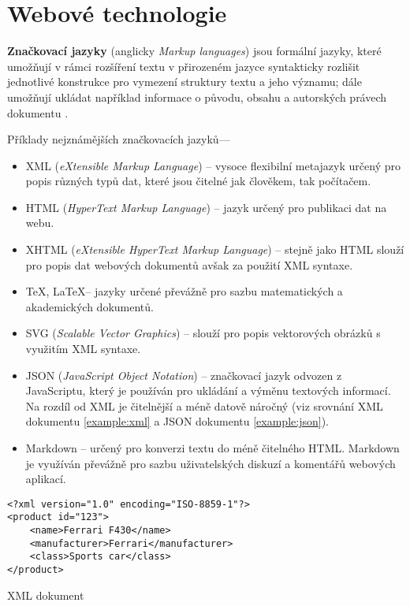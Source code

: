\chapter{Webové technologie}
\label{chap:languages}

\textbf{Značkovací jazyky} (anglicky \textit{Markup languages}) jsou formální jazyky, které umožňují v rámci rozšíření textu v přirozeném jazyce syntakticky rozlišit jednotlivé konstrukce pro vymezení struktury textu a jeho významu; dále umožňují ukládat například informace o původu, obsahu a autorských právech dokumentu \cite{modern-markup}.

Příklady nejznámějších značkovacích jazyků---

\begin{itemize}
    \item XML (\textit{eXtensible Markup Language}) -- vysoce flexibilní metajazyk určený pro popis různých typů dat, které jsou čitelné jak člověkem, tak počítačem.
    \item HTML (\textit{HyperText Markup Language}) -- jazyk určený pro publikaci dat na webu.
    \item XHTML (\textit{eXtensible HyperText Markup Language}) -- stejně jako HTML slouží pro popis dat webových dokumentů avšak za použití XML syntaxe.
    \item \TeX, \LaTeX -- jazyky určené převážně pro sazbu matematických a akademických dokumentů.
    \item SVG (\textit{Scalable Vector Graphics}) -- slouží pro popis vektorových obrázků s využitím XML syntaxe.
    \item JSON (\textit{JavaScript Object Notation}) -- značkovací jazyk odvozen z JavaScriptu, který je používán pro ukládání a výměnu textových informací. Na rozdíl od XML je čitelnější a méně datově náročný (viz srovnání XML dokumentu \ref{example:xml} a JSON dokumentu \ref{example:json}).
    \item Markdown -- určený pro konverzi textu do méně čitelného HTML. Markdown je využíván převážně pro sazbu uživatelských diskuzí a komentářů webových aplikací.
\end{itemize}

\begin{example}
    \centering
    \begin{lstlisting}
<?xml version="1.0" encoding="ISO-8859-1"?>
<product id="123">
    <name>Ferrari F430</name>
    <manufacturer>Ferrari</manufacturer>
    <class>Sports car</class>
</product>
    \end{lstlisting}
    \caption{XML dokument}
    \label{example:xml}
\end{example}

